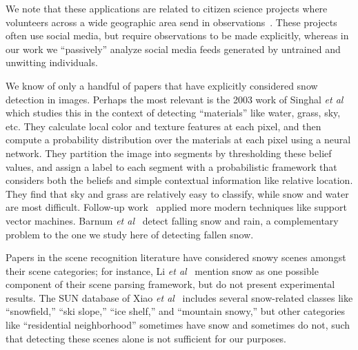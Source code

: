 \documentclass[10pt,journal,compsoc]{IEEEtran}
\begin{document}
We note that these applications are related to citizen science
projects where volunteers across a wide geographic area send 
in observations~\cite{greatsunflower,ebirds,king09snowtweets}. These projects
often use social media, but require observations to be made
explicitly, whereas in our work we ``passively'' analyze social
media feeds generated by untrained and unwitting individuals.

 We know of only a handful of
papers that have explicitly considered snow detection in
images. Perhaps the most relevant is the 2003 work of Singhal
\textit{et al}~\cite{singhal2003spatialcontext,luo2003spatialcontext}
which studies this in the context of detecting ``materials'' like
water, grass, sky, etc. They calculate local color and texture
features at each pixel, and then compute a probability
distribution over the materials at each pixel using a neural
network. They partition the image into segments by thresholding these
belief values, and assign a label to each segment with a probabilistic
framework that considers both the beliefs and simple
contextual information like relative location.
 They find that sky and grass
are relatively easy to classify, while snow and water are
most difficult.  Follow-up work~\cite{boutell2006semanticfeature,boutell2005exploiting}
applied more modern techniques like
support vector machines.  Barnum \textit{et al}~\cite{rain2009IJCV}
detect falling snow and rain, a complementary problem
to the one we study here of detecting fallen
snow.

Papers in the scene recognition literature have considered
snowy scenes amongst their scene categories; for instance, Li \textit{et
  al}~\cite{li2009totalscene,li2007event} mention snow as one possible
component of their scene parsing framework, but do not present
experimental results. The SUN database of Xiao \textit{et
  al}~\cite{XiaoHEOT10} includes several snow-related classes like
``snowfield,'' ``ski slope,'' ``ice shelf,'' and ``mountain snowy,''
but other categories like ``residential neighborhood'' sometimes have
snow and sometimes do not, such that detecting these scenes alone
is not sufficient for our purposes. 






\end{document}

